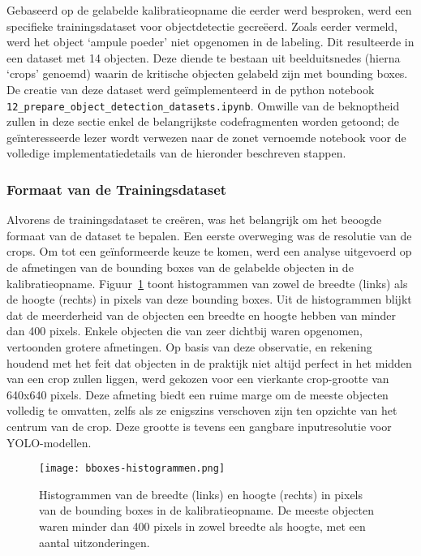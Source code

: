 Gebaseerd op de gelabelde kalibratieopname die eerder werd besproken, werd een specifieke trainingsdataset voor objectdetectie gecreëerd.
Zoals eerder vermeld, werd het object `ampule poeder' niet opgenomen in de labeling. Dit resulteerde in een dataset met 14 objecten.
Deze diende te bestaan uit beelduitsnedes (hierna `crops' genoemd) waarin de kritische objecten gelabeld zijn met bounding boxes.
De creatie van deze dataset werd geïmplementeerd in de python notebook \texttt{12\_prepare\_object\_detection\_datasets.ipynb}.
Omwille van de beknoptheid zullen in deze sectie enkel de belangrijkste codefragmenten worden getoond; 
de geïnteresseerde lezer wordt verwezen naar de zonet vernoemde notebook voor de volledige implementatiedetails van de hieronder beschreven stappen.

\subsubsection{Formaat van de Trainingsdataset}

Alvorens de trainingsdataset te creëren, was het belangrijk om het beoogde formaat van de dataset te bepalen.
Een eerste overweging was de resolutie van de crops. 
Om tot een geïnformeerde keuze te komen, werd een analyse uitgevoerd op de afmetingen van de bounding boxes 
van de gelabelde objecten in de kalibratieopname. 
Figuur~\ref{fig:size-histogram} toont histogrammen van zowel de breedte (links) als de hoogte (rechts) 
in pixels van deze bounding boxes. 
Uit de histogrammen blijkt dat de meerderheid van de objecten een breedte en hoogte hebben van minder dan 400 pixels. 
Enkele objecten die van zeer dichtbij waren opgenomen, vertoonden grotere afmetingen. 
Op basis van deze observatie, en rekening houdend met het feit dat objecten in de praktijk 
niet altijd perfect in het midden van een crop zullen liggen, 
werd gekozen voor een vierkante crop-grootte van 640x640 pixels. 
Deze afmeting biedt een ruime marge om de meeste objecten volledig te omvatten, zelfs als ze enigszins 
verschoven zijn ten opzichte van het centrum van de crop. 
Deze grootte is tevens een gangbare inputresolutie voor YOLO-modellen.

\begin{figure}[H]
    \centering
    \texttt{[image: bboxes-histogrammen.png]}
    \caption[Histogrammen van de breedte en grootte van bounding boxes in de kalibratieopname]{
      \label{fig:size-histogram}
      Histogrammen van de breedte (links) en hoogte (rechts) in pixels van de bounding boxes in de kalibratieopname.
      De meeste objecten waren minder dan 400 pixels in zowel breedte als hoogte, met een aantal uitzonderingen.
    }
\end{figure}

